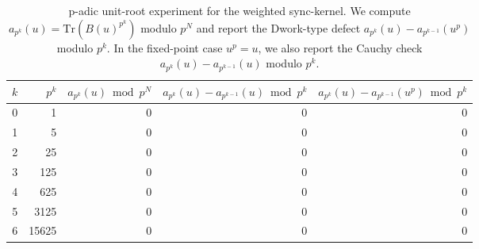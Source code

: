 \begin{table}[H]
\centering
\scriptsize
\setlength{\tabcolsep}{6pt}
\caption{p-adic unit-root experiment for the weighted sync-kernel. We compute $a_{p^k}(u)=\mathrm{Tr}(B(u)^{p^k})$ modulo $p^N$ and report the Dwork-type defect $a_{p^k}(u)-a_{p^{k-1}}(u^p)$ modulo $p^k$. In the fixed-point case $u^p=u$, we also report the Cauchy check $a_{p^k}(u)-a_{p^{k-1}}(u)$ modulo $p^k$.}
\label{tab:sync_kernel_weighted_padic_unit_root}
\begin{tabular}{r r r r r}
\toprule
$k$ & $p^k$ & $a_{p^k}(u)\bmod p^N$ & $a_{p^k}(u)-a_{p^{k-1}}(u)\bmod p^k$ & $a_{p^k}(u)-a_{p^{k-1}}(u^p)\bmod p^k$\\
\midrule
0 & 1 & 0 & 0 & 0\\
1 & 5 & 0 & 0 & 0\\
2 & 25 & 0 & 0 & 0\\
3 & 125 & 0 & 0 & 0\\
4 & 625 & 0 & 0 & 0\\
5 & 3125 & 0 & 0 & 0\\
6 & 15625 & 0 & 0 & 0\\
\bottomrule
\end{tabular}
\end{table}
